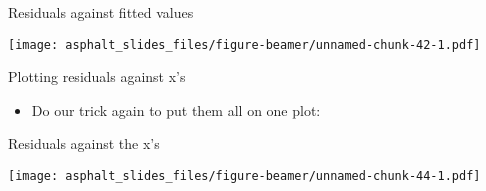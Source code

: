 \begin{frame}[fragile]{Residuals against fitted values}
\protect\hypertarget{residuals-against-fitted-values}{}
\begin{Shaded}
\begin{Highlighting}[]
\end{Highlighting}
\end{Shaded}

\texttt{[image: asphalt\_slides\_files/figure-beamer/unnamed-chunk-42-1.pdf]}
\end{frame}

\begin{frame}[fragile]{Plotting residuals against x's}
\protect\hypertarget{plotting-residuals-against-xs}{}
\begin{itemize}
\tightlist
\item
  Do our trick again to put them all on one plot:
\end{itemize}

\begin{Shaded}
\begin{Highlighting}[]
\OperatorTok{\%\textgreater{}\%}
\StringTok{  }\NormalTok{(}\OperatorTok{\%\textgreater{}\%}\StringTok{ }
\StringTok{  }\NormalTok{(}
    \OperatorTok{:}
    \NormalTok{, }\NormalTok{,}
\NormalTok{  ) }\OperatorTok{\%\textgreater{}\%}
\StringTok{  }\NormalTok{(}\NormalTok{(}\OperatorTok{+}\StringTok{ }\NormalTok{() }\OperatorTok{+}
\StringTok{  }\NormalTok{(}\OperatorTok{\textasciitilde{}} \NormalTok{) {-}\textgreater{}}\StringTok{ }
\end{Highlighting}
\end{Shaded}
\end{frame}

\begin{frame}[fragile]{Residuals against the x's}
\protect\hypertarget{residuals-against-the-xs}{}
\begin{Shaded}
\begin{Highlighting}[]
\end{Highlighting}
\end{Shaded}

\texttt{[image: asphalt\_slides\_files/figure-beamer/unnamed-chunk-44-1.pdf]}
\end{frame}

